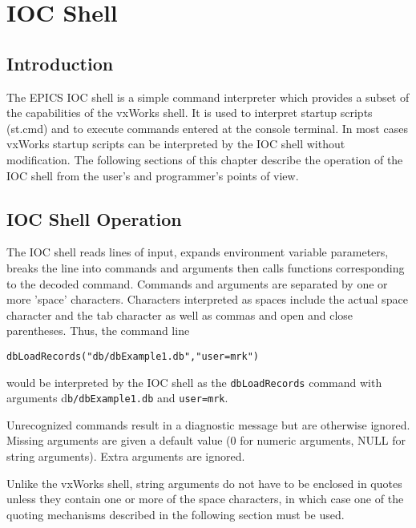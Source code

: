 





\chapter{IOC Shell}

\section{Introduction}

The EPICS IOC shell is a simple command interpreter which provides a subset of the capabilities of the vxWorks shell. It 
is used to interpret startup scripts (st.cmd) and to execute commands entered at the console terminal.  In most cases 
vxWorks startup scripts can be interpreted by the IOC shell without modification. The following sections of this chapter 
describe the operation of the IOC shell from the user's and programmer's points of view.

\section{IOC Shell Operation}

The IOC shell reads lines of input, expands environment variable parameters, breaks the line into commands and 
arguments then calls functions corresponding to the decoded command. Commands and arguments are separated by one 
or more 'space' characters. Characters interpreted as spaces include the actual space character and the tab character as 
well as commas and open and close parentheses. Thus, the command line

\begin{verbatim}dbLoadRecords("db/dbExample1.db","user=mrk")
\end{verbatim}would be interpreted by the IOC shell as the \verb|dbLoadRecords| command with arguments d\verb|b/dbExample1.db| and 
\verb|user=mrk|.

Unrecognized commands result in a diagnostic message but are otherwise ignored.  Missing arguments are given a default 
value (0 for numeric arguments, NULL for string arguments).  Extra arguments are ignored.

Unlike the vxWorks shell, string arguments do not have to be enclosed in quotes unless they contain one or more of the 
space characters, in which case one of the quoting mechanisms described in the following section must be used.

